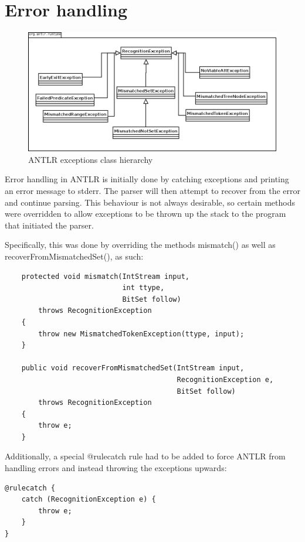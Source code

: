 \section{Error handling}
\label{sec:impl:errorhandling}
\begin{figure}[!h]
  \centering
    \includegraphics[width=1\textwidth]{img/exception_uml.png}
  \caption{ANTLR exceptions class hierarchy}
\end{figure}
Error handling in ANTLR is initially done by catching exceptions and printing
an error message to stderr. The parser will then attempt to recover from the
error and continue parsing. This behaviour is not always desirable, so certain
methods were overridden to allow exceptions to be thrown up the stack to the
program that initiated the parser.

Specifically, this was done by overriding the methods mismatch() as well as
recoverFromMismatchedSet(), as such:

\begin{verbatim}
    protected void mismatch(IntStream input, 
                            int ttype, 
                            BitSet follow)
        throws RecognitionException
    {
        throw new MismatchedTokenException(ttype, input);
    }

    public void recoverFromMismatchedSet(IntStream input, 
                                         RecognitionException e, 
                                         BitSet follow)
        throws RecognitionException
    {
        throw e;
    }
\end{verbatim}

Additionally, a special @rulecatch rule had to be added to force ANTLR from
handling errors and instead throwing the exceptions upwards:

\begin{verbatim}
@rulecatch {
    catch (RecognitionException e) {
        throw e;
    }
}
\end{verbatim}